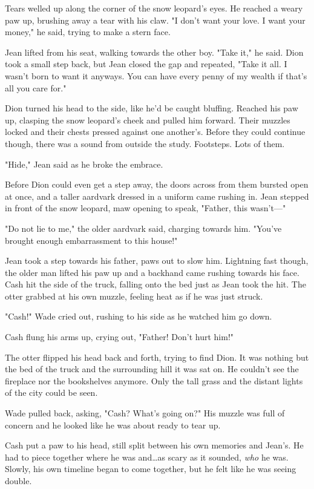 Tears welled up along the corner of the snow leopard's eyes. He reached a weary paw up, brushing away a tear with his claw. "I don't want your love. I want your money," he said, trying to make a stern face.

Jean lifted from his seat, walking towards the other boy. "Take it," he said. Dion took a small step back, but Jean closed the gap and repeated, "Take it all. I wasn't born to want it anyways. You can have every penny of my wealth if that's all you care for."

Dion turned his head to the side, like he'd be caught bluffing. Reached his paw up, clasping the snow leopard's cheek and pulled him forward. Their muzzles locked and their chests pressed against one another's. Before they could continue though, there was a sound from outside the study. Footsteps. Lots of them.

"Hide," Jean said as he broke the embrace.

Before Dion could even get a step away, the doors across from them bursted open at once, and a taller aardvark dressed in a uniform came rushing in. Jean stepped in front of the snow leopard, maw opening to speak, "Father, this wasn't---"

"Do not lie to me," the older aardvark said, charging towards him. "You've brought enough embarrassment to this house!"

Jean took a step towards his father, paws out to slow him. Lightning fast though, the older man lifted his paw up and a backhand came rushing towards his face. Cash hit the side of the truck, falling onto the bed just as Jean took the hit. The otter grabbed at his own muzzle, feeling heat as if he was just struck.

"Cash!" Wade cried out, rushing to his side as he watched him go down.

Cash flung his arms up, crying out, "Father! Don't hurt him!"

The otter flipped his head back and forth, trying to find Dion. It was nothing but the bed of the truck and the surrounding hill it was sat on. He couldn't see the fireplace nor the bookshelves anymore. Only the tall grass and the distant lights of the city could be seen.

Wade pulled back, asking, "Cash? What's going on?" His muzzle was full of concern and he looked like he was about ready to tear up.

Cash put a paw to his head, still split between his own memories and Jean's. He had to piece together where he was and\ldots as scary as it sounded, \emph{who} he was. Slowly, his own timeline began to come together, but he felt like he was seeing double.

